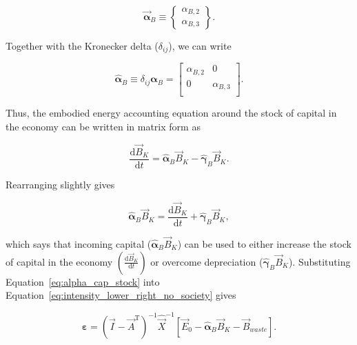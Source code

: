 \begin{equation}
	\vec{\boldsymbol{\alpha}}_{B}
	\equiv
	\begin{Bmatrix}
		\alpha_{B,2}	\\
		\alpha_{B,3}
	\end{Bmatrix}.
\end{equation}

\noindent{}Together with the Kronecker delta ($\delta_{ij}$), we can write

\begin{equation}
	\hat{\boldsymbol{\alpha}}_{B}
	\equiv
	\delta_{ij} \boldsymbol{\alpha}_{B}
	=
	\begin{bmatrix}
		\alpha_{B,2}	& 0           \\
		0               & \alpha_{B,3}  \\
	\end{bmatrix}.
\end{equation}

\noindent{}Thus, the embodied energy accounting equation around
the stock of capital in the economy can be written in matrix form as

\begin{equation}
	\frac{\mathrm{d}\vec{B}_{K}}{\mathrm{d}t}
	= \hat{\boldsymbol{\alpha}}_{B} \vec{B}_{K}
	- \hat{\boldsymbol{\gamma}}_{B} \vec{B}_{K}.
\end{equation}

\noindent{}Rearranging slightly gives

\begin{equation} \label{eq:alpha_cap_stock}
	\hat{\boldsymbol{\alpha}}_{B} \vec{B}_{K}
	= \frac{\mathrm{d}\vec{B}_{K}}{\mathrm{d}t}
	+ \hat{\boldsymbol{\gamma}}_{B} \vec{B}_{K},
\end{equation}

\noindent{}which says that incoming capital ($\hat{\boldsymbol{\alpha}}_{B} \vec{B}_{K}$)
can be used to either
increase the stock of capital in the economy 
$\left( \frac{\mathrm{d}\vec{B}_{K}}{\mathrm{d}t} \right)$
or overcome depreciation ($\hat{\boldsymbol{\gamma}}_{B} \vec{B}_{K}$).
Substituting Equation~\ref{eq:alpha_cap_stock} into
Equation~\ref{eq:intensity_lower_right_no_society} gives

\begin{equation} \label{eq:epsilon_leontief_with_A_alpha}
	\boldsymbol{\varepsilon} 
	= {(\vec{I} - \vec{A}^{\mathrm{T}})}^{-1}\hat{\vec{X}}^{-1}
		\left[\vec{E}_{0} 
				- \hat{\boldsymbol{\alpha}}_{B} \vec{B}_{K}
				- \vec{B}_{waste}
		\right].
\end{equation}


